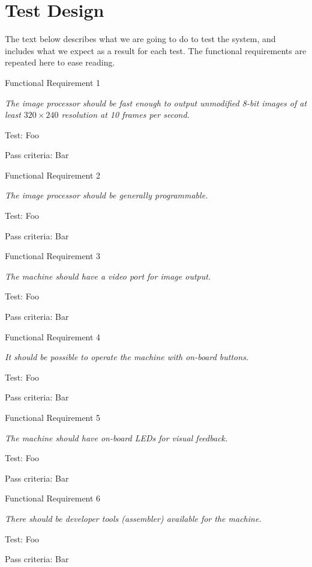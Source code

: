 \section{Test Design}

The text below describes what we are going to do to test the system, and
includes what we expect as a result for each test. The functional requirements
are repeated here to ease reading.

{\sc Functional Requirement 1}
\begin{addmargin}[2cm]{0cm}
  {\em The image processor should be fast enough to output unmodified 8-bit
    images of at least $320\times240$ resolution at 10 frames per second.}

  {\sc Test:} Foo

  {\sc Pass criteria:} Bar
\end{addmargin}

{\sc Functional Requirement 2}
\begin{addmargin}[2cm]{0cm}
  {\em The image processor should be generally programmable.}
  
  {\sc Test:} Foo

  {\sc Pass criteria:} Bar
\end{addmargin}

{\sc Functional Requirement 3}
\begin{addmargin}[2cm]{0cm}
  {\em The machine should have a video port for image output.}
  
  {\sc Test:} Foo

  {\sc Pass criteria:} Bar
\end{addmargin}

{\sc Functional Requirement 4}
\begin{addmargin}[2cm]{0cm}
  {\em It should be possible to operate the machine with on-board buttons.}
  
  {\sc Test:} Foo

  {\sc Pass criteria:} Bar
\end{addmargin}

{\sc Functional Requirement 5}
\begin{addmargin}[2cm]{0cm}
  {\em The machine should have on-board LEDs for visual feedback.}
  
  {\sc Test:} Foo

  {\sc Pass criteria:} Bar
\end{addmargin}

{\sc Functional Requirement 6}
\begin{addmargin}[2cm]{0cm}
  {\em There should be developer tools (assembler) available for the machine.}
  
  {\sc Test:} Foo

  {\sc Pass criteria:} Bar
\end{addmargin}

